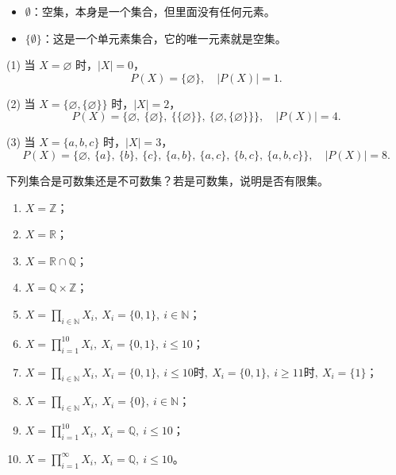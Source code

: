 \begin{solution}
\begin{itemize}
  \item $\emptyset$：空集，本身是一个集合，但里面没有任何元素。
  \item $\{\emptyset\}$：这是一个单元素集合，它的唯一元素就是空集。
\end{itemize}(1) 当 $X = \varnothing$ 时，$|X| = 0$，  
\[
P(X) = \{\varnothing\}, \quad |P(X)| = 1.
\]

(2) 当 $X = \{\varnothing, \{\varnothing\}\}$ 时，$|X| = 2$，  
\[
P(X) = \big\{ \varnothing,\ \{\varnothing\},\ \{\{\varnothing\}\},\ \{\varnothing, \{\varnothing\}\} \big\}, 
\quad |P(X)| = 4.
\]

(3) 当 $X = \{a,b,c\}$ 时，$|X| = 3$，  
\[
P(X) = \big\{ \varnothing,\ \{a\},\ \{b\},\ \{c\},\ \{a,b\},\ \{a,c\},\ \{b,c\},\ \{a,b,c\} \big\}, 
\quad |P(X)| = 8.
\]
\end{solution}

\begin{homework}[1.18]
下列集合是可数集还是不可数集？若是可数集，说明是否有限集。
\begin{enumerate}[(1)]
  \item $X = \mathbb{Z}$；
  \item $X = \mathbb{R}$；
  \item $X = \mathbb{R}\cap \mathbb{Q}$；
  \item $X = \mathbb{Q}\times \mathbb{Z}$；
  \item $X = \prod_{i\in\mathbb{N}} X_i, \ X_i=\{0,1\},\ i\in\mathbb{N}$；
  \item $X = \prod_{i=1}^{10} X_i, \ X_i=\{0,1\},\ i\leq 10$；
  \item $X = \prod_{i\in\mathbb{N}} X_i, \ X_i=\{0,1\},\ i\leq 10时,\ X_i=\{0,1\},\ i\geq 11时,\ X_i=\{1\}$；
  \item $X = \prod_{i\in\mathbb{N}} X_i, \ X_i=\{0\},\ i\in\mathbb{N}$；
  \item $X = \prod_{i=1}^{10} X_i, \ X_i=\mathbb{Q},\ i\leq 10$；
  \item $X = \prod_{i=1}^{\infty} X_i, \ X_i=\mathbb{Q},\ i\leq 10$。
\end{enumerate}
\end{homework}

